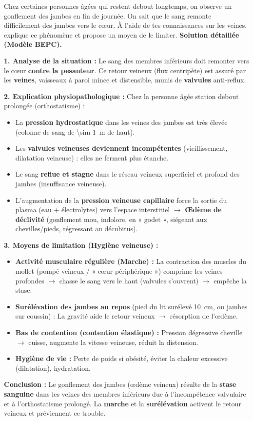 \documentclass[11pt]{article}
\begin{document}
\begin{exoresolu}
Chez certaines personnes âgées qui restent debout longtemps, on observe un gonflement des jambes en fin de journée. On sait que le sang remonte difficilement des jambes vers le cœur. À l'aide de tes connaissances sur les veines, explique ce phénomène et propose un moyen de le limiter.
\tcblower
\textbf{Solution détaillée (Modèle BEPC).}

\textbf{1. Analyse de la situation :}
Le sang des membres inférieurs doit remonter vers le cœur \textbf{contre la pesanteur}. Ce retour veineux (flux centripète) est assuré par les \textbf{veines}, vaisseaux à paroi mince et distensible, munis de \textbf{valvules} anti-reflux.

\textbf{2. Explication physiopathologique :}
Chez la personne âgée station debout prolongée (orthostatisme) :
\begin{itemize}
\item La \textbf{pression hydrostatique} dans les veines des jambes est très élevée (colonne de sang de \SI{\sim 1}{m} de haut).
\item Les \textbf{valvules veineuses deviennent incompétentes} (vieillissement, dilatation veineuse) : elles ne ferment plus étanche.
\item Le sang \textbf{reflue et stagne} dans le réseau veineux superficiel et profond des jambes (insuffisance veineuse).
\item L'augmentation de la \textbf{pression veineuse capillaire} force la sortie du plasma (eau + électrolytes) vers l'espace interstitiel $\rightarrow$ \textbf{Œdème de déclivité} (gonflement mou, indolore, en « godet », siégeant aux chevilles/pieds, régressant au décubitus).
\end{itemize}

\textbf{3. Moyens de limitation (Hygiène veineuse) :}
\begin{itemize}
\item \textbf{Activité musculaire régulière (Marche) :} La contraction des muscles du mollet (pompé veineux / « cœur périphérique ») comprime les veines profondes $\rightarrow$ chasse le sang vers le haut (valvules s'ouvrent) $\rightarrow$ empêche la stase.
\item \textbf{Surélévation des jambes au repos} (pied du lit surélevé \SI{10}{cm}, ou jambes sur coussin) : La gravité aide le retour veineux $\rightarrow$ résorption de l'œdème.
\item \textbf{Bas de contention (contention élastique) :} Pression dégressive cheville $\rightarrow$ cuisse, augmente la vitesse veineuse, réduit la distension.
\item \textbf{Hygiène de vie :} Perte de poids si obésité, éviter la chaleur excessive (dilatation), hydratation.
\end{itemize}

\textbf{Conclusion :} Le gonflement des jambes (œdème veineux) résulte de la \textbf{stase sanguine} dans les veines des membres inférieurs due à l'incompétence valvulaire et à l'orthostatisme prolongé. La \textbf{marche} et la \textbf{surélévation} activent le retour veineux et préviennent ce trouble.
\end{exoresolu}
\end{document}
